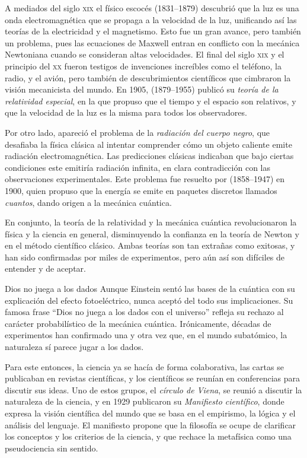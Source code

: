 A mediados del siglo \textsc{xix} el físico escocés  (1831--1879) descubrió que la luz es una onda electromagnética que se propaga a la velocidad de la luz, unificando así las teorías de la electricidad y el magnetismo.
Esto fue un gran avance, pero también un problema, pues las ecuaciones de Maxwell entran en conflicto con la mecánica Newtoniana cuando se consideran altas velocidades.
El final del siglo \textsc{xix} y el principio del \textsc{xx} fueron testigos de invenciones increíbles como el teléfono, la radio, y el avión, pero también de descubrimientos científicos que cimbraron la visión mecanicista del mundo.
En 1905,  (1879--1955) publicó su \emph{teoría de la relatividad especial}, en la que propuso que el tiempo y el espacio son relativos, y que la velocidad de la luz es la misma para todos los observadores.

Por otro lado, apareció el problema de la \emph{radiación del cuerpo negro}, que desafiaba la física clásica al intentar comprender cómo un objeto caliente emite radiación electromagnética.
Las predicciones clásicas indicaban que bajo ciertas condiciones este emitiría radiación infinita, en clara contradicción con las observaciones experimentales.
Este problema fue resuelto por  (1858--1947) en 1900, quien propuso que la energía se emite en paquetes discretos llamados \emph{cuantos}, dando origen a la mecánica cuántica.

En conjunto, la teoría de la relatividad y la mecánica cuántica revolucionaron la física y la ciencia en general, disminuyendo la confianza en la teoría de Newton y en el método científico clásico.
Ambas teorías son tan extrañas como exitosas, y han sido confirmadas por miles de experimentos, pero aún así son difíciles de entender y de aceptar.

\begin{digress}{Dios no juega a los dados}
	Aunque Einstein sentó las bases de la cuántica con su explicación del efecto fotoeléctrico, nunca aceptó del todo sus implicaciones.
	Su famosa frase “Dios no juega a los dados con el universo” refleja su rechazo al carácter probabilístico de la mecánica cuántica.
	Irónicamente, décadas de experimentos han confirmado una y otra vez que, en el mundo subatómico, la naturaleza sí parece jugar a los dados.
\end{digress}

Para este entonces, la ciencia ya se hacía de forma colaborativa, las cartas se publicaban en revistas científicas, y los científicos se reunían en conferencias para discutir sus ideas.
Uno de estos grupos, el \emph{círculo de Viena}, se reunió a discutir la naturaleza de la ciencia, y en 1929 publicaron su \emph{Manifiesto científico}, donde expresa la visión científica del mundo que se basa en el empirismo, la lógica y el análisis del lenguaje.
El manifiesto propone que la filosofía se ocupe de clarificar los conceptos y los criterios de la ciencia, y que rechace la metafísica como una pseudociencia sin sentido.


